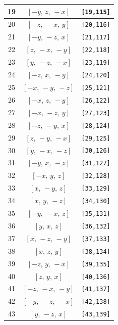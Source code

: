 \documentclass[fleqn,8pt]{jsarticle}
\begin{document}
\begin{longtable}{ccc}
19 & $\left[ - y,\, z,\, - x \right]$ & {\tt [19,115]} \\ \hline
20 & $\left[ - z,\, - x,\, y \right]$ & {\tt [20,116]} \\ \hline
21 & $\left[ - y,\, - z,\, x \right]$ & {\tt [21,117]} \\ \hline
22 & $\left[ z,\, - x,\, - y \right]$ & {\tt [22,118]} \\ \hline
23 & $\left[ y,\, - z,\, - x \right]$ & {\tt [23,119]} \\ \hline
24 & $\left[ - z,\, x,\, - y \right]$ & {\tt [24,120]} \\ \hline
25 & $\left[ - x,\, - y,\, - z \right]$ & {\tt [25,121]} \\ \hline
26 & $\left[ - x,\, z,\, - y \right]$ & {\tt [26,122]} \\ \hline
27 & $\left[ - x,\, - z,\, y \right]$ & {\tt [27,123]} \\ \hline
28 & $\left[ - z,\, - y,\, x \right]$ & {\tt [28,124]} \\ \hline
29 & $\left[ z,\, - y,\, - x \right]$ & {\tt [29,125]} \\ \hline
30 & $\left[ y,\, - x,\, - z \right]$ & {\tt [30,126]} \\ \hline
31 & $\left[ - y,\, x,\, - z \right]$ & {\tt [31,127]} \\ \hline
32 & $\left[ - x,\, y,\, z \right]$ & {\tt [32,128]} \\ \hline
33 & $\left[ x,\, - y,\, z \right]$ & {\tt [33,129]} \\ \hline
34 & $\left[ x,\, y,\, - z \right]$ & {\tt [34,130]} \\ \hline
35 & $\left[ - y,\, - x,\, z \right]$ & {\tt [35,131]} \\ \hline
36 & $\left[ y,\, x,\, z \right]$ & {\tt [36,132]} \\ \hline
37 & $\left[ x,\, - z,\, - y \right]$ & {\tt [37,133]} \\ \hline
38 & $\left[ x,\, z,\, y \right]$ & {\tt [38,134]} \\ \hline
39 & $\left[ - z,\, y,\, - x \right]$ & {\tt [39,135]} \\ \hline
40 & $\left[ z,\, y,\, x \right]$ & {\tt [40,136]} \\ \hline
41 & $\left[ - z,\, - x,\, - y \right]$ & {\tt [41,137]} \\ \hline
42 & $\left[ - y,\, - z,\, - x \right]$ & {\tt [42,138]} \\ \hline
43 & $\left[ y,\, - z,\, x \right]$ & {\tt [43,139]} \\ \hline

\end{longtable}
\end{document}
